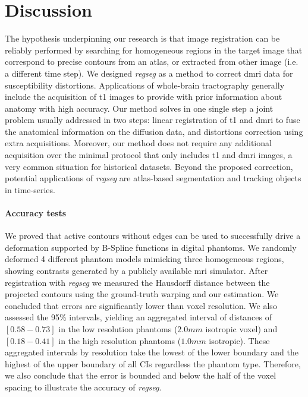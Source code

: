 \section{Discussion}
\label{sec:discussion}

The hypothesis underpinning our research is that image registration can be reliably performed
  by searching for homogeneous regions in the target image that correspond to precise contours
  from an atlas, or extracted from other image (i.e. a different time step).
We designed \emph{regseg} as a method to correct \gls*{dmri} data for susceptibility
  distortions.
Applications of whole-brain tractography generally include the acquisition of \gls*{t1} images
  to provide with prior information about anatomy with high accuracy.
Our method solves in one single step a joint problem usually addressed in two steps:
  linear registration of \gls*{t1} and \gls*{dmri} to fuse the anatomical information on
  the diffusion data, and distortions correction using extra acquisitions.
Moreover, our method does not require any additional acquisition over the minimal protocol
  that only includes \gls*{t1} and \gls*{dmri} images, a very common situation for
  historical datasets.
Beyond the proposed correction, potential applications of \emph{regseg} are atlas-based
  segmentation and tracking objects in time-series.

\paragraph*{Accuracy tests}
We proved that active contours without edges can be used to successfully drive a
  deformation supported by B-Spline functions in digital phantoms.
We randomly deformed 4 different phantom models mimicking three homogeneous regions,
  showing contrasts generated by a publicly available \gls*{mri} simulator.
After registration with \emph{regseg} we measured the Hausdorff distance between the
  projected contours using the ground-truth warping and our estimation.
We concluded that errors are significantly lower than voxel resolution.
We also assessed the 95\% intervals, yielding an aggregated interval of distances of
  $[0.58 - 0.73]$ in the low resolution phantoms ($2.0mm$ isotropic voxel) and
  $[0.18 - 0.41]$ in the high resolution phantoms ($1.0mm$ isotropic).
These aggregated intervals by resolution take the lowest of the lower boundary
  and the highest of the upper boundary of all CIs regardless the phantom type.
Therefore, we also conclude that the error is bounded and below the half of the
  voxel spacing to illustrate the accuracy of \emph{regseg}.

